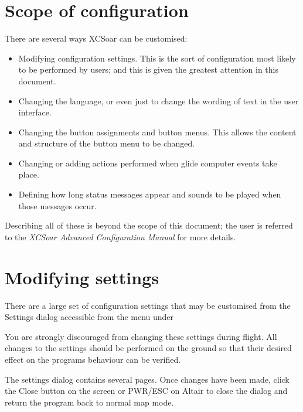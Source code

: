 \documentclass[a4paper,12pt]{refrep}
\begin{document}
\section{Scope of configuration}

There are several ways XCSoar can be customised:
\begin{itemize}

\item Modifying configuration settings.  This is the sort of configuration
 most likely to be performed by users; and this is given the greatest attention in this document.
\item Changing the language, or even just to change the wording
  of text in the user interface.
\item Changing the button assignments and button menus.  This allows 
the content and structure of the button menu to be changed. 
\item Changing or adding actions performed when glide computer events
 take place.
\item Defining how long status messages appear and sounds to be played
 when those messages occur.
\end{itemize}
Describing all of these is beyond the scope of this document;
the user is referred to the {\em XCSoar Advanced Configuration Manual} 
for more details.

\section{Modifying settings}

There are a large set of configuration settings that may be customised
from the Settings dialog accessible from the menu under
\begin{quote}
\blink{}
\end{quote}

You are strongly discouraged from changing these settings during
flight.  \warning  All changes to the settings should be performed on the ground
so that their desired effect on the programs behaviour can be
verified.


The settings dialog contains several pages.  Once changes have been made,
click the Close button on the screen or PWR/ESC on Altair to close the dialog
and return the program back to normal map mode.
\end{document}
